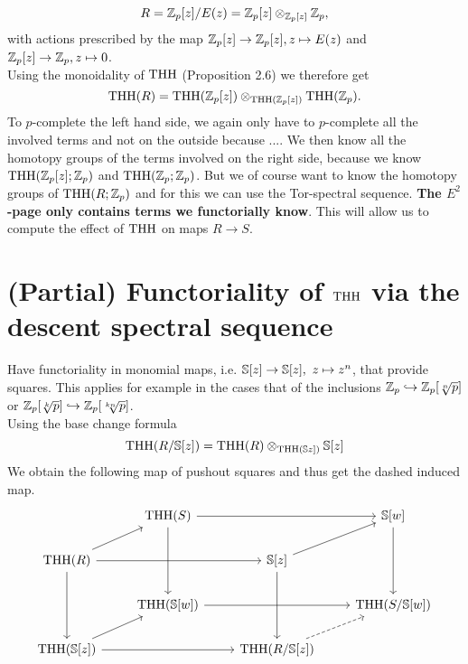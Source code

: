 \begin{equation*}
    R=\Z_p[z]/E(z)=\Z_p[z]\otimes_{\Z_p[z]}\Z_p,
\end{equation*}
with actions prescribed by the map $\Z_p[z]\ra \Z_p[z], z\mapsto E(z)$ and $\Z_p[z]\to \Z_p, z\mapsto 0$. \\
Using the monoidality of $\THH$ (Proposition 2.6) we therefore get 
\begin{equation*}
    \THH(R)=\THH(\Z_p[z])\otimes_{\THH(\Z_p[z])}\THH(\Z_p).
\end{equation*}
To $p$-complete the left hand side, we again only have to $p$-complete all the involved terms and not on the outside because .... We then know all the homotopy groups of the terms involved on the right side, because we know $\THH(\Z_p[z];\Z_p) $ and $\THH(\Z_p;\Z_p)$. But we of course want to know the homotopy groups of $\THH(R;\Z_p)$ and for this we can use the Tor-spectral sequence. \textbf{The $E^2$-page only contains terms we functorially know}. This will allow us to compute the effect of $\THH$ on maps $R\to S$.
\section{(Partial) Functoriality of $\THH$ via the descent spectral sequence}
Have functoriality in monomial maps, i.e. $\S[z]\to \S[z],\  z\mapsto z^n$, that provide squares. This applies for example in the cases that of the inclusions $\Z_p\hookrightarrow \Z_p[\sqrt[n]{p}]$ or $\Z_p[\sqrt[k]{p}]\hookrightarrow \Z_p[\sqrt[kn]{p}]$. \\
Using the base change formula 
\begin{equation*}
    \THH(R/\S[z])=\THH(R)\otimes_{\THH(\S{z]})}\S[z]
\end{equation*}
We obtain the following map of pushout squares and thus get the dashed induced map.
\[\begin{tikzcd}
	& {\THH(S)} && {\S[w]} \\
	{\THH(R)} && {\S[z]} \\
	& {\THH(\S[w])} && {\THH(S/\S[w])} \\
	{\THH(\S[z])} && {\THH(R/\S[z])}
	\arrow[from=4-1, to=4-3]
	\arrow[from=2-1, to=4-1]
	\arrow[from=2-1, to=2-3]
	\arrow[from=2-3, to=4-3]
	\arrow[from=2-1, to=1-2]
	\arrow[from=2-3, to=1-4]
	\arrow[dashed, from=4-3, to=3-4]
	\arrow[from=1-4, to=3-4]
	\arrow[from=4-1, to=3-2]
	\arrow[from=3-2, to=3-4]
	\arrow[from=1-2, to=3-2]
	\arrow[from=1-2, to=1-4]
\end{tikzcd}\]